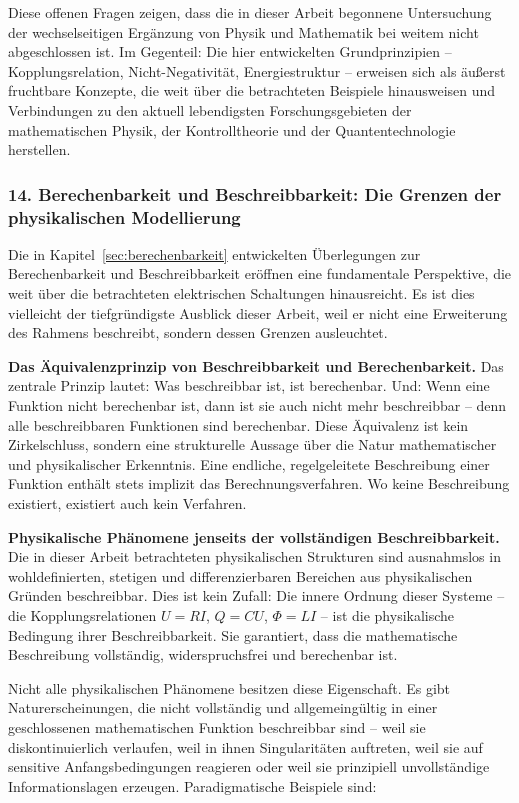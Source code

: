 ﻿\documentclass[12pt, a4paper]{article}
\begin{document}
	Diese offenen Fragen zeigen, dass die in dieser Arbeit begonnene Untersuchung der wechselseitigen Ergänzung von Physik und Mathematik bei weitem nicht abgeschlossen ist. Im Gegenteil: Die hier entwickelten Grundprinzipien -- Kopplungsrelation, Nicht-Negativität, Energiestruktur -- erweisen sich als äußerst fruchtbare Konzepte, die weit über die betrachteten Beispiele hinausweisen und Verbindungen zu den aktuell lebendigsten Forschungsgebieten der mathematischen Physik, der Kontrolltheorie und der Quantentechnologie herstellen.

	\subsubsection*{14. \quad Berechenbarkeit und Beschreibbarkeit: Die Grenzen der physikalischen Modellierung}

	Die in Kapitel~\ref{sec:berechenbarkeit} entwickelten Überlegungen zur Berechenbarkeit und Beschreibbarkeit eröffnen eine fundamentale Perspektive, die weit über die betrachteten elektrischen Schaltungen hinausreicht. Es ist dies vielleicht der tiefgründigste Ausblick dieser Arbeit, weil er nicht eine Erweiterung des Rahmens beschreibt, sondern dessen Grenzen ausleuchtet.

	\textbf{Das Äquivalenzprinzip von Beschreibbarkeit und Berechenbarkeit.}
	Das zentrale Prinzip lautet: Was beschreibbar ist, ist berechenbar. Und: Wenn eine Funktion nicht berechenbar ist, dann ist sie auch nicht mehr beschreibbar -- denn alle beschreibbaren Funktionen sind berechenbar. Diese Äquivalenz ist kein Zirkelschluss, sondern eine strukturelle Aussage über die Natur mathematischer und physikalischer Erkenntnis. Eine endliche, regelgeleitete Beschreibung einer Funktion enthält stets implizit das Berechnungsverfahren. Wo keine Beschreibung existiert, existiert auch kein Verfahren.

	\textbf{Physikalische Phänomene jenseits der vollständigen Beschreibbarkeit.}
	Die in dieser Arbeit betrachteten physikalischen Strukturen sind ausnahmslos in wohldefinierten, stetigen und differenzierbaren Bereichen aus physikalischen Gründen beschreibbar. Dies ist kein Zufall: Die innere Ordnung dieser Systeme -- die Kopplungsrelationen $U = RI$, $Q = CU$, $\Phi = LI$ -- ist die physikalische Bedingung ihrer Beschreibbarkeit. Sie garantiert, dass die mathematische Beschreibung vollständig, widerspruchsfrei und berechenbar ist.

	Nicht alle physikalischen Phänomene besitzen diese Eigenschaft. Es gibt Naturerscheinungen, die nicht vollständig und allgemeingültig in einer geschlossenen mathematischen Funktion beschreibbar sind -- weil sie diskontinuierlich verlaufen, weil in ihnen Singularitäten auftreten, weil sie auf sensitive Anfangsbedingungen reagieren oder weil sie prinzipiell unvollständige Informationslagen erzeugen. Paradigmatische Beispiele sind:
\end{document}
